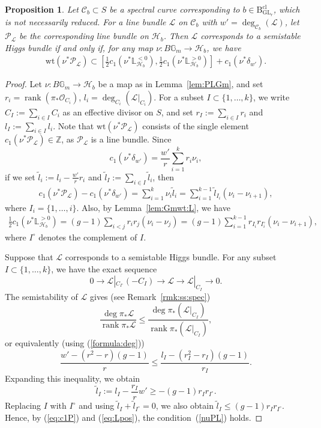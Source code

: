 \documentclass[11pt,oneside,a4paper,mathscr]{amsart}
\newtheorem{prop}[thm]{Proposition}
\theoremstyle{definition}
\renewcommand{\leq}{\leqslant}
\renewcommand{\geq}{\geqslant}
\newcommand{\cH}{\mathcal{H}}
\newcommand{\cL}{\mathcal{L}}
\newcommand{\cC}{\mathcal{C}}
\newcommand{\cP}{\mathcal{P}}
\newcommand{\cO}{\mathcal{O}}
\newcommand{\bgm}{B\mathbb{G}_m}
\newcommand{\rank}{\operatorname{rank}}
\newcommand{\rB}{\mathrm{B}}
\newcommand{\GL}{\operatorname{GL}}
\newcommand{\wt}{\mathrm{wt}}
\begin{document}
\begin{prop}\label{prop:natural}
Let $\mathcal{C}_b \subset S$ be a spectral curve corresponding to
$b \in \rB_{\GL_r}^{\mathrm{cl}}$, which is not necessarily reduced. For a line
bundle $\mathcal{L}$ on $\cC_b$ with $w'=\deg_{\cC_b}(\mathcal{L})$, let
$\cP_{\mathcal{L}}$ be the corresponding line bundle on $\cH_b$. Then
$\mathcal{L}$ corresponds to a semistable Higgs bundle if and only if, for
any map $\nu \colon \bgm \to \cH_b$, we have
\begin{align}\label{nuPL}
\wt(\nu^* \cP_{\mathcal{L}})
\subset
\left[
 \frac{1}{2}c_1(\nu^*\mathbb{L}^{<0}_{\cH_b}),
 \frac{1}{2}c_1(\nu^* \mathbb{L}_{\cH_b}^{>0})
\right]
+c_1(\nu^* \delta_{w'}).
\end{align}
\end{prop}

\begin{proof}
Let $\nu \colon \bgm \to \cH_b$ be a map as in
Lemma~\ref{lem:PLGm}, and set $r_i=\operatorname{rank}(\pi_{*}\cO_{C_i})$, 
$l_i=\deg_{C_i}(\cL|_{C_i})$.  For a subset
$I\subset \{1,\ldots,k\}$, we write
$C_I:=\sum_{i\in I} C_i$ as an effective divisor on $S$, and set
$r_I:=\sum_{i\in I}r_i$ and $l_I:=\sum_{i\in I}l_i$. 
Note that $\wt(\nu^* \cP_{\mathcal{L}})$ consists of the single element
$c_1(\nu^* \cP_{\mathcal{L}})\in \mathbb{Z}$, as $\cP_{\mathcal{L}}$ is a line bundle.
Since
\[
c_1(\nu^* \delta_{w'})
=
\frac{w'}{r}\sum_{i=1}^k r_i \nu_i,
\]
if we set
$\widetilde{l}_i:=l_i-\frac{w'}{r}r_i$ and
$\widetilde{l}_I:=\sum_{i\in I}\widetilde{l}_i$, then
\begin{align}\label{eq:c1P}
c_1(\nu^* \cP_{\mathcal{L}})-c_1(\nu^* \delta_{w'})
=
\sum_{i=1}^k \nu_i \widetilde{l}_i
=
\sum_{i=1}^{k-1}\widetilde{l}_{I_i}(\nu_i-\nu_{i+1}),
\end{align}
where $I_i=\{1,\ldots,i\}$. Also, by Lemma~\ref{lem:Gmwt:L}, we have
\begin{align}\label{eq:Lpos}
    \frac{1}{2}c_1(\nu^* \mathbb{L}_{\cH_b}^{>0})
    =
    (g-1)\sum_{i<j}r_i r_j(\nu_i-\nu_j)
    =
    (g-1)\sum_{i=1}^{k-1}
    r_{I_i}r_{I_i^{\circ}}(\nu_i-\nu_{i+1}),
\end{align}
where $I^{\circ}$ denotes the complement of $I$.

Suppose that $\mathcal{L}$ corresponds to a semistable Higgs bundle.
For any subset $I\subset \{1,\ldots,k\}$, we have the exact sequence
\[
0 \to \mathcal{L}|_{C_{I^{\circ}}}(-C_I) \to \mathcal{L}
\to \mathcal{L}|_{C_I} \to 0 .
\]
The semistability of $\mathcal{L}$ gives (see Remark~\ref{rmk:ss:spec})
\[
\frac{\deg \pi_{*}\mathcal{L}}{\rank \pi_{*}\mathcal{L}}
\leq
\frac{\deg \pi_{*}(\mathcal{L}|_{C_I})}
     {\rank \pi_{*}(\mathcal{L}|_{C_I})},
\]
or equivalently (using (\ref{formula:deg}))
\[
\frac{w'-(r^2-r)(g-1)}{r}
\leq
\frac{l_I-(r_I^2-r_I)(g-1)}{r_I}.
\]
Expanding this inequality, we obtain
\[
    \widetilde{l}_I
    :=
    l_I-\frac{r_I}{r}w'
    \geq
    -(g-1)r_I r_{I^{\circ}}.
\]
Replacing $I$ with $I^{\circ}$ and using
$\widetilde{l}_I+\widetilde{l}_{I^{\circ}}=0$, we also obtain
$\widetilde{l}_I \leq (g-1)r_I r_{I^{\circ}}$. Hence, by
(\ref{eq:c1P}) and (\ref{eq:Lpos}), the condition~(\ref{nuPL}) holds.


\end{proof}
\end{document}
